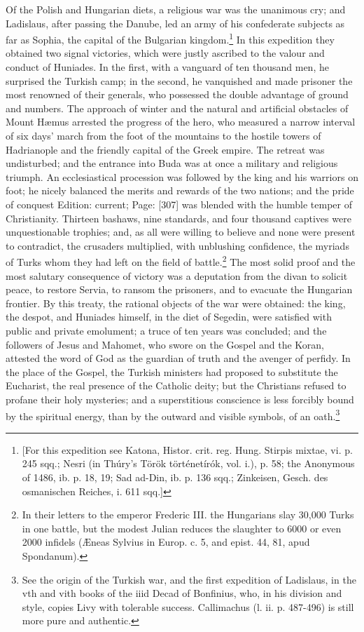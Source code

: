 Of the Polish and Hungarian diets, a religious war was the unanimous cry; and Ladislaus, after passing the Danube, led an army of his confederate subjects as far as Sophia, the capital of the Bulgarian kingdom.\footnote{[For this expedition see Katona, Histor. crit. reg. Hung. Stirpis mixtae, vi. p. 245 sqq.; Nesri (in Thúry\texthebrew{}’s Török történetírók, vol. i.), p. 58; the Anonymous of 1486, ib. p. 18, 19; Sad ad-Din, ib. p. 136 sqq.; Zinkeisen, Gesch. des osmanischen Reiches, i. 611 sqq.]} In this expedition they obtained two signal victories, which were justly ascribed to the valour and conduct of Huniades. In the first, with a vanguard of ten thousand men, he surprised the Turkish camp; in the second, he vanquished and made prisoner the most renowned of their generals, who possessed the double advantage of ground and numbers. The approach of winter and the natural and artificial obstacles of Mount Hæmus arrested the progress of the hero, who measured a narrow interval of six days\texthebrew{}’ march from the foot of the mountains to the hostile towers of Hadrianople and the friendly capital of the Greek empire. The retreat was undisturbed; and the entrance into Buda was at once a military and religious triumph. An ecclesiastical procession was followed by the king and his warriors on foot; he nicely balanced the merits and rewards of the two nations; and the pride of conquest Edition: current; Page: [307] was blended with the humble temper of Christianity. Thirteen bashaws, nine standards, and four thousand captives were unquestionable trophies; and, as all were willing to believe and none were present to contradict, the crusaders multiplied, with unblushing confidence, the myriads of Turks whom they had left on the field of battle.\footnote{In their letters to the emperor Frederic III. the Hungarians slay 30,000 Turks in one battle, but the modest Julian reduces the slaughter to 6000 or even 2000 infidels (Æneas Sylvius in Europ. c. 5, and epist. 44, 81, apud Spondanum).} The most solid proof and the most salutary consequence of victory was a deputation from the divan to solicit peace, to restore Servia, to ransom the prisoners, and to evacuate the Hungarian frontier. By this treaty, the rational objects of the war were obtained: the king, the despot, and Huniades himself, in the diet of Segedin, were satisfied with public and private emolument; a truce of ten years was concluded; and the followers of Jesus and Mahomet, who swore on the Gospel and the Koran, attested the word of God as the guardian of truth and the avenger of perfidy. In the place of the Gospel, the Turkish ministers had proposed to substitute the Eucharist, the real presence of the Catholic deity; but the Christians refused to profane their holy mysteries; and a superstitious conscience is less forcibly bound by the spiritual energy, than by the outward and visible symbols, of an oath.\footnote{See the origin of the Turkish war, and the first expedition of Ladislaus, in the vth and vith books of the iiid Decad of Bonfinius, who, in his division and style, copies Livy with tolerable success. Callimachus (l. ii. p. 487-496) is still more pure and authentic.}

